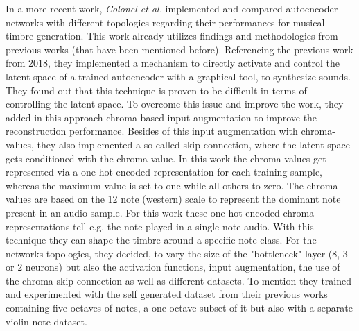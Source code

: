 In a more recent work, \textit{Colonel et al.} implemented and compared autoencoder networks with different topologies regarding their performances for musical timbre generation. \cite{Colonel2020} This work already utilizes findings and methodologies from previous works (that have been mentioned before). Referencing the previous work from 2018, they implemented a mechanism to directly activate and control the latent space of a trained autoencoder with a graphical tool, to synthesize sounds. They found out that this technique is proven to be difficult in terms of controlling the latent space. To overcome this issue and improve the work, they added in this approach chroma-based input augmentation to improve the reconstruction performance. Besides of this input augmentation with chroma-values, they also implemented a so called skip connection, where the latent space gets conditioned with the chroma-value. In this work the chroma-values get represented via a one-hot encoded representation for each training sample, whereas the maximum value is set to one while all others to zero. The chroma-values are based on the 12 note (western) scale to represent the dominant note present in an audio sample. For this work these one-hot encoded chroma representations tell e.g. the note played in a single-note audio. With this technique they can shape the timbre around a specific note class. For the networks topologies, they decided, to vary the size of the "bottleneck"-layer (8, 3 or 2 neurons) but also the activation functions, input augmentation, the use of the chroma skip connection as well as different datasets. To mention they trained and experimented with the self generated dataset from their previous works containing five octaves of notes, a one octave subset of it but also with a separate violin note dataset.

